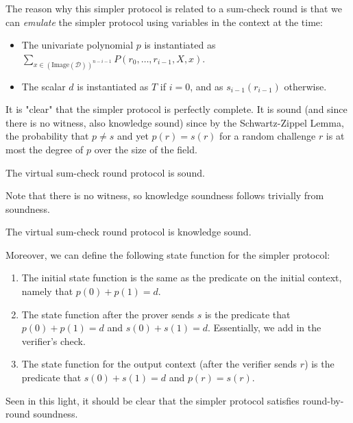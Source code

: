 The reason why this simpler protocol is related to a sum-check round is that we can \emph{emulate} the simpler protocol using variables in the context at the time:
\begin{itemize}
    \item The univariate polynomial $p$ is instantiated as $\sum_{x \in (\text{Image}(\mathcal{D}))^{n - i - 1}} P(r_0, \ldots, r_{i - 1}, X, x)$.
    \item The scalar $d$ is instantiated as $T$ if $i = 0$, and as $s_{i - 1}(r_{i - 1})$ otherwise.
\end{itemize}

It is "clear" that the simpler protocol is perfectly complete. It is sound (and since there is no
witness, also knowledge sound) since by the Schwartz-Zippel Lemma, the probability that $p \ne s$
and yet $p(r) = s(r)$ for a random challenge $r$ is at most the degree of $p$ over the size of the
field.

\begin{theorem}
    The virtual sum-check round protocol is sound.
    \label{thm:virtual_sumcheck_round_protocol_sound}
\end{theorem}

Note that there is no witness, so knowledge soundness follows trivially from soundness.

\begin{theorem}
    The virtual sum-check round protocol is knowledge sound.
    \label{thm:virtual_sumcheck_round_protocol_knowledge_sound}
\end{theorem}

Moreover, we can define the following state function for the simpler protocol:
\begin{enumerate}
    \item The initial state function is the same as the predicate on the initial context, namely that
    $p(0) + p(1) = d$.
    \item The state function after the prover sends $s$ is the predicate that $p(0) + p(1) = d$ and
    $s(0) + s(1) = d$. Essentially, we add in the verifier's check.
    \item The state function for the output context (after the verifier sends $r$) is the predicate that $s(0) + s(1) = d$ and $p(r) = s(r)$.
\end{enumerate}
Seen in this light, it should be clear that the simpler protocol satisfies round-by-round soundness.

